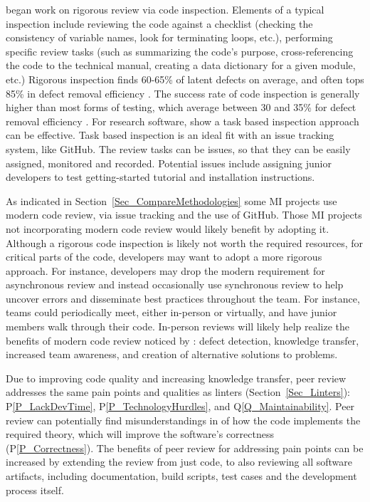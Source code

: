 \documentclass[final, 3p, times, authoryear]{elsarticle}
\newcommand{\ppref}[1]{P\ref{#1}}
\newcommand{\qref}[1]{Q\ref{#1}}
\begin{document}
\citet{Fagan1976} began work on rigorous review via code inspection.  Elements
of a typical inspection include reviewing the code against a checklist (checking
the consistency of variable names, look for terminating loops, etc.), performing
specific review tasks (such as summarizing the code's purpose, cross-referencing
the code to the technical manual, creating a data dictionary for a given module,
etc.) Rigorous inspection finds 60-65\% of latent defects on average, and often
tops 85\% in defect removal efficiency \citep{Jones2008}. The success rate of
code inspection is generally higher than most forms of testing, which average
between 30 and 35\% for defect removal efficiency \citep{EbertAndJones2009,
Jones2008}. For research software, \citep{KellyAndShepard2000} show a task based
inspection approach can be effective. Task based inspection is an ideal fit with
an issue tracking system, like GitHub.  The review tasks can be issues, so that
they can be easily assigned, monitored and recorded. Potential issues include
assigning junior developers to test getting-started tutorial and installation
instructions.

As indicated in Section~\ref{Sec_CompareMethodologies} some MI projects use
modern code review, via issue tracking and the use of GitHub.  Those MI projects
not incorporating modern code review would likely benefit by adopting it.
Although a rigorous code inspection is likely not worth the required resources,
for critical parts of the code, developers may want to adopt a more rigorous
approach. For instance, developers may drop the modern requirement for
asynchronous review and instead occasionally use synchronous review to help
uncover errors and disseminate best practices throughout the team.  For
instance, teams could periodically meet, either in-person or virtually, and have
junior members walk through their code.  In-person reviews will likely help
realize the benefits of modern code review noticed by
\citet{BirdAndBacchelli2013}: defect detection, knowledge transfer, increased
team awareness, and creation of alternative solutions to problems.

Due to improving code quality and increasing knowledge transfer, peer review
addresses the same pain points and qualities as linters
(Section~\ref{Sec_Linters}): \ppref{P_LackDevTime}, \ppref{P_TechnologyHurdles},
and \qref{Q_Maintainability}. Peer review can potentially find misunderstandings
in of how the code implements the required theory, which will improve the
software's correctness (\ppref{P_Correctness}). The benefits of peer review for
addressing pain points can be increased by extending the review from just code,
to also reviewing all software artifacts, including documentation, build
scripts, test cases and the development process itself.
\end{document}
